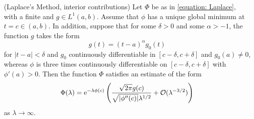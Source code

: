 \begin{thm}
	(Laplace's Method, interior contributions) Let $\Phi$ be as in \ref{equation: Laplace}, with a finite and $g \in L^1(a,b)$. Assume that $\phi$ has a unique global minimum at $t=c \in (a,b)$. In addition, suppose that for some $\delta > 0$ and some $\alpha > -1$, the function $g$ takes the form
	$$ g(t) = (t-a)^{\alpha} g_0(t)$$
	for $|t-a| < \delta$ and $g_0$ continuously differentiable in $[c-\delta, c+\delta]$ and $g_0(a) \neq 0$, whereas $\phi$ is three times continuously differentiable on $[c-\delta, c+\delta]$ with $\phi'(a) > 0$. Then the function $\Phi$ satisfies an estimate of the form
	\begin{equation}
		\Phi(\lambda) = \operatorname{e}^{-\lambda \phi(c)} \left( \frac{\sqrt{2\pi} g(c)}{\sqrt{|\phi''(c)|}\lambda^{1/2}} + \mathcal{O}(\lambda^{-3/2})\right)
	\end{equation}
	as $\lambda \rightarrow \infty$.
	\label{prop: (Laplace's Method, interior contributions)}
\end{thm}

